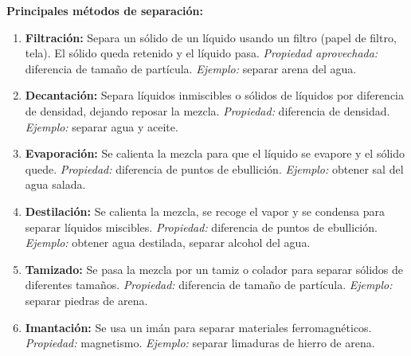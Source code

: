 \documentclass[12pt, a4paper]{article}
\begin{document}
\begin{cuadroteoria}
\textbf{Principales métodos de separación:}

\begin{enumerate}[leftmargin=*, label=\arabic*.]
  \item \textbf{Filtración:} Separa un sólido de un líquido usando un filtro (papel de filtro, tela). El sólido queda retenido y el líquido pasa. \textit{Propiedad aprovechada:} diferencia de tamaño de partícula. \textit{Ejemplo:} separar arena del agua.

  \item \textbf{Decantación:} Separa líquidos inmiscibles o sólidos de líquidos por diferencia de densidad, dejando reposar la mezcla. \textit{Propiedad:} diferencia de densidad. \textit{Ejemplo:} separar agua y aceite.

  \item \textbf{Evaporación:} Se calienta la mezcla para que el líquido se evapore y el sólido quede. \textit{Propiedad:} diferencia de puntos de ebullición. \textit{Ejemplo:} obtener sal del agua salada.

  \item \textbf{Destilación:} Se calienta la mezcla, se recoge el vapor y se condensa para separar líquidos miscibles. \textit{Propiedad:} diferencia de puntos de ebullición. \textit{Ejemplo:} obtener agua destilada, separar alcohol del agua.

  \item \textbf{Tamizado:} Se pasa la mezcla por un tamiz o colador para separar sólidos de diferentes tamaños. \textit{Propiedad:} diferencia de tamaño de partícula. \textit{Ejemplo:} separar piedras de arena.

  \item \textbf{Imantación:} Se usa un imán para separar materiales ferromagnéticos. \textit{Propiedad:} magnetismo. \textit{Ejemplo:} separar limaduras de hierro de arena.
\end{enumerate}
\end{cuadroteoria}
\end{document}
